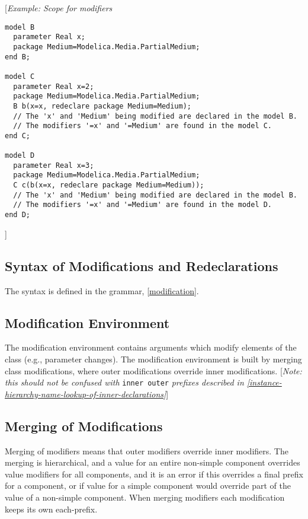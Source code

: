 {[}\emph{Example: Scope for modifiers}
\begin{lstlisting}[language=modelica]
model B
  parameter Real x;
  package Medium=Modelica.Media.PartialMedium;
end B;

model C
  parameter Real x=2;
  package Medium=Modelica.Media.PartialMedium;
  B b(x=x, redeclare package Medium=Medium);
  // The 'x' and 'Medium' being modified are declared in the model B.
  // The modifiers '=x' and '=Medium' are found in the model C.
end C;

model D
  parameter Real x=3;
  package Medium=Modelica.Media.PartialMedium;
  C c(b(x=x, redeclare package Medium=Medium));
  // The 'x' and 'Medium' being modified are declared in the model B.
  // The modifiers '=x' and '=Medium' are found in the model D.
end D;
\end{lstlisting}

{]}

\subsection{Syntax of Modifications and Redeclarations}

The syntax is defined in the grammar, \autoref{modification}.

\subsection{Modification Environment}

The modification environment contains arguments which modify elements of
the class (e.g., parameter changes). The modification environment is
built by merging class modifications, where outer modifications override
inner modifications. {[}\emph{Note: this should not be confused with}
\lstinline!inner outer! \emph{prefixes described in \autoref{instance-hierarchy-name-lookup-of-inner-declarations}}{]}

\subsection{Merging of Modifications}

Merging of modifiers means that outer modifiers override inner
modifiers. The merging is hierarchical, and a value for an entire
non-simple component overrides value modifiers for all components, and
it is an error if this overrides a final prefix for a component, or if
value for a simple component would override part of the value of a
non-simple component. When merging modifiers each modification keeps its
own each-prefix.

